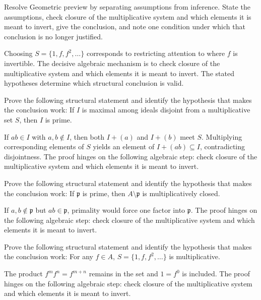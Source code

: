 \begin{problem}\label{prob:v05-problem-08}
Resolve Geometric preview by separating assumptions from inference. State the assumptions, check closure of the multiplicative system and which elements it is meant to invert, give the conclusion, and note one condition under which that conclusion is no longer justified.
\end{problem}
\begin{solution}
Choosing $S=\{1,f,f^2,\dots\}$ corresponds to restricting attention to where $f$ is invertible. The decisive algebraic mechanism is to check closure of the multiplicative system and which elements it is meant to invert. The stated hypotheses determine which structural conclusion is valid.
\end{solution}

\begin{problem}\label{prob:v05-problem-09}
Prove the following structural statement and identify the hypothesis that makes the conclusion work: If $I$ is maximal among ideals disjoint from a multiplicative set $S$, then $I$ is prime.
\end{problem}
\begin{solution}
If $ab\in I$ with $a,b\notin I$, then both $I+(a)$ and $I+(b)$ meet $S$. Multiplying corresponding elements of $S$ yields an element of $I+(ab)\subseteq I$, contradicting disjointness. The proof hinges on the following algebraic step: check closure of the multiplicative system and which elements it is meant to invert.
\end{solution}

\begin{problem}\label{prob:v05-problem-10}
Prove the following structural statement and identify the hypothesis that makes the conclusion work: If $\mathfrak p$ is prime, then $A\setminus\mathfrak p$ is multiplicatively closed.
\end{problem}
\begin{solution}
If $a,b\notin\mathfrak p$ but $ab\in\mathfrak p$, primality would force one factor into $\mathfrak p$. The proof hinges on the following algebraic step: check closure of the multiplicative system and which elements it is meant to invert.
\end{solution}

\begin{problem}\label{prob:v05-problem-11}
Prove the following structural statement and identify the hypothesis that makes the conclusion work: For any $f\in A$, $S=\{1,f,f^2,\dots\}$ is multiplicative.
\end{problem}
\begin{solution}
The product $f^m f^n=f^{m+n}$ remains in the set and $1=f^0$ is included. The proof hinges on the following algebraic step: check closure of the multiplicative system and which elements it is meant to invert.
\end{solution}

